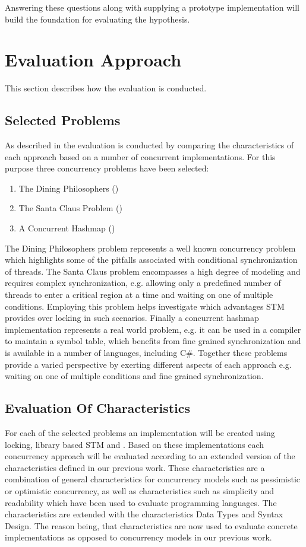 Answering these questions along with supplying a prototype implementation will build the foundation for evaluating the hypothesis.

\section{Evaluation Approach}\label{sec:eval_approach}
This section describes how the evaluation is conducted.
\subsection{Selected Problems}
As described in  the evaluation is conducted by comparing the characteristics of each approach based on a number of concurrent implementations. For this purpose three concurrency problems have been selected:
\begin{enumerate}
\item The Dining Philosophers ()
\item The Santa Claus Problem ()
\item A Concurrent Hashmap ()
\end{enumerate}
The Dining Philosophers problem represents a well known concurrency problem which highlights some of the pitfalls associated with conditional synchronization of threads. The Santa Claus problem encompasses a high degree of modeling and requires complex synchronization, e.g. allowing only a predefined number of threads to enter a critical region at a time and waiting on one of multiple conditions. Employing this problem helps investigate which advantages \ac{STM} provides over locking in such scenarios. Finally a concurrent hashmap implementation represents a real world problem, e.g. it can be used in a compiler to maintain a symbol table, which benefits from fine grained synchronization and is available in a number of languages, including C\#. Together these problems provide a varied perspective by exerting different aspects of each approach e.g. waiting on one of multiple conditions and fine grained synchronization.

\subsection{Evaluation Of Characteristics}
For each of the selected problems an implementation will be created using locking, library based \ac{STM} and \stmname. Based on these implementations each concurrency approach will be evaluated according to an extended version of the characteristics defined in our previous work\cite[p. 15-21]{dpt907e14trending}. These characteristics are a combination of general characteristics for concurrency models such as pessimistic or optimistic concurrency, as well as characteristics such as simplicity and readability which have been used to evaluate programming languages\cite[p. 7]{sebestaProLang}. The characteristics are extended with the characteristics Data Types and Syntax Design. The reason being, that characteristics are now used to evaluate concrete implementations as opposed to concurrency models in our previous work\cite{dpt907e14trending}.

